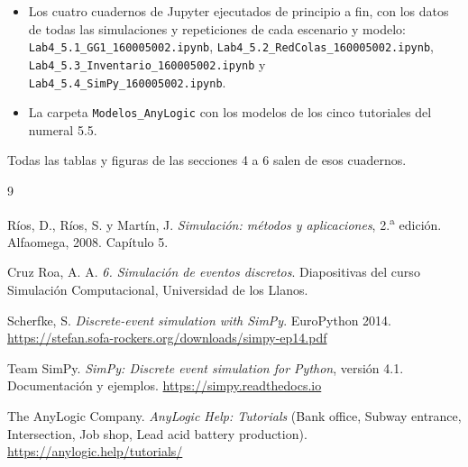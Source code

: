 \documentclass[11pt,letterpaper]{article}
\newcommand{\codigoEstudiante}{160005002}
\begin{document}
\begin{itemize}[itemsep=2pt]
\item Los cuatro cuadernos de Jupyter ejecutados de principio a fin, con los datos de todas las simulaciones y
repeticiones de cada escenario y modelo:
\texttt{Lab4\_5.1\_GG1\_\codigoEstudiante.ipynb}, \texttt{Lab4\_5.2\_RedColas\_\codigoEstudiante.ipynb},
\texttt{Lab4\_5.3\_Inventario\_\codigoEstudiante.ipynb} y \texttt{Lab4\_5.4\_SimPy\_\codigoEstudiante.ipynb}.
\item La carpeta \texttt{Modelos\_AnyLogic} con los modelos de los cinco tutoriales del numeral 5.5.
\end{itemize}

Todas las tablas y figuras de las secciones 4 a 6 salen de esos cuadernos.

\begin{thebibliography}{9}

Ríos, D., Ríos, S. y Martín, J. \emph{Simulación: métodos y aplicaciones}, 2.\textsuperscript{a} edición.
Alfaomega, 2008. Capítulo 5.

Cruz Roa, A. A. \emph{6. Simulación de eventos discretos}. Diapositivas del curso Simulación Computacional,
Universidad de los Llanos.

Scherfke, S. \emph{Discrete-event simulation with SimPy}. EuroPython 2014.
\url{https://stefan.sofa-rockers.org/downloads/simpy-ep14.pdf}

Team SimPy. \emph{SimPy: Discrete event simulation for Python}, versión 4.1. Documentación y ejemplos.
\url{https://simpy.readthedocs.io}

The AnyLogic Company. \emph{AnyLogic Help: Tutorials} (Bank office, Subway entrance, Intersection, Job shop,
Lead acid battery production). \url{https://anylogic.help/tutorials/}

\end{thebibliography}
\end{document}
